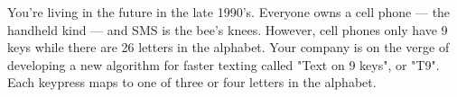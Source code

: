 You're living in the future in the late 1990's. Everyone owns a cell phone --- the handheld kind --- and SMS is the bee's knees. However, cell phones only have 9 keys while there are 26 letters in the alphabet. Your company is on the verge of developing a new algorithm for faster texting called "Text on 9 keys", or "T9". Each keypress maps to one of three or four letters in the alphabet.